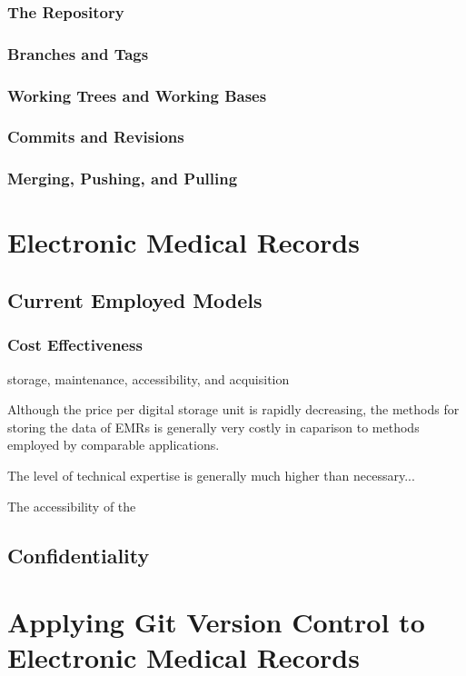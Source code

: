 \documentclass{acm_proc_article-sp}
\begin{document}
\subsubsection{The Repository}
\subsubsection{Branches and Tags}
\subsubsection{Working Trees and Working Bases}
\subsubsection{Commits and Revisions}
\subsubsection{Merging, Pushing, and Pulling}

\section{Electronic Medical Records}
\subsection{Current Employed Models}
\subsubsection{Cost Effectiveness}

storage, maintenance, accessibility, and acquisition

Although the price per digital storage unit is rapidly decreasing, the methods for storing 
the data of EMRs is generally very costly in caparison to methods employed by comparable 
applications.  

The level of technical expertise is generally much higher than necessary...

The accessibility of the 

\subsection{Confidentiality}

\section{Applying Git Version Control to Electronic Medical Records}
\end{document}

